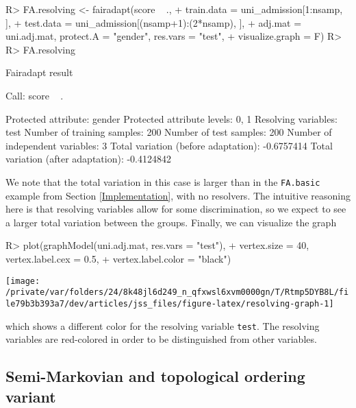 \documentclass[
  notitle]{jss}
\begin{document}
\begin{CodeChunk}
\begin{CodeInput}
R> FA.resolving <- fairadapt(score ~ .,
+   train.data = uni_admission[1:nsamp, ],
+   test.data = uni_admission[(nsamp+1):(2*nsamp), ],
+   adj.mat = uni.adj.mat, protect.A = "gender", res.vars = "test",
+   visualize.graph = F)
R> 
R> FA.resolving
\end{CodeInput}
\begin{CodeOutput}
Fairadapt result

Call:
 score ~ . 

Protected attribute:                  gender 
Protected attribute levels:           0, 1 
Resolving variables:                  test 
Number of training samples:           200 
Number of test samples:               200 
Number of independent variables:      3 
Total variation (before adaptation):  -0.6757414 
Total variation (after adaptation):   -0.4124842 
\end{CodeOutput}
\end{CodeChunk}

We note that the total variation in this case is larger than in the
\texttt{FA.basic} example from Section \ref{Implementation}, with no
resolvers. The intuitive reasoning here is that resolving variables
allow for some discrimination, so we expect to see a larger total
variation between the groups. Finally, we can visualize the graph

\begin{CodeChunk}
\begin{CodeInput}
R> plot(graphModel(uni.adj.mat, res.vars = "test"),
+   vertex.size = 40, vertex.label.cex = 0.5,
+   vertex.label.color = "black")
\end{CodeInput}


\begin{center}\texttt{[image: /private/var/folders/24/8k48jl6d249\_n\_qfxwsl6xvm0000gn/T/Rtmp5DYB8L/file79b3b393a7/dev/articles/jss\_files/figure-latex/resolving-graph-1]} \end{center}

\end{CodeChunk}

which shows a different color for the resolving variable \texttt{test}.
The resolving variables are red-colored in order to be distinguished
from other variables.

\hypertarget{semi-markovian-and-topological-ordering-variant}{%
\subsection{Semi-Markovian and topological ordering
variant}\label{semi-markovian-and-topological-ordering-variant}}
\end{document}
